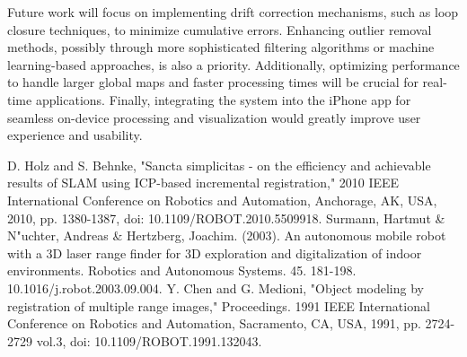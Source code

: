 \documentclass[conference]{IEEEtran}
\begin{document}
    Future work will focus on implementing drift correction mechanisms, such as loop closure
    techniques, to minimize cumulative errors.
    Enhancing outlier removal methods, possibly through more sophisticated filtering algorithms or
    machine learning-based approaches, is also a priority.
    Additionally, optimizing performance to handle larger global maps and faster processing times
    will be crucial for real-time applications.
    Finally, integrating the system into the iPhone app for seamless on-device processing and
    visualization would greatly improve user experience and usability.

    \begin{thebibliography}{00}
         D. Holz and S. Behnke, "Sancta simplicitas - on the efficiency and achievable results of SLAM using ICP-based incremental registration," 2010 IEEE International Conference on Robotics and Automation, Anchorage, AK, USA, 2010, pp. 1380-1387, doi: 10.1109/ROBOT.2010.5509918.
         Surmann, Hartmut & N"uchter, Andreas & Hertzberg, Joachim. (2003). An autonomous mobile robot with a 3D laser range finder for 3D exploration and digitalization of indoor environments. Robotics and Autonomous Systems. 45. 181-198. 10.1016/j.robot.2003.09.004.
         Y. Chen and G. Medioni, "Object modeling by registration of multiple range images," Proceedings. 1991 IEEE International Conference on Robotics and Automation, Sacramento, CA, USA, 1991, pp. 2724-2729 vol.3, doi: 10.1109/ROBOT.1991.132043.
    \end{thebibliography}
\end{document}
